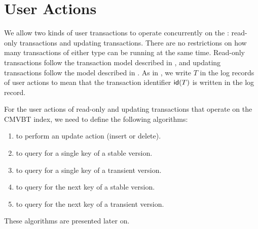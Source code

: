 \section{User Actions}
\label{sec:cmvbt:user-actions}

We allow two kinds of user transactions to operate concurrently on
the : read-only transactions and updating transactions. 
There are no restrictions on how many transactions of either type
can be running at the same time.
Read-only transactions follow the transaction model described in
, and updating transactions follow the
model described in .
As in , we write $T$ in the log records of
user actions to mean that the transaction identifier $\text{\textsf{id}}(T)$ is written in
the log record.

For the user actions of read-only and updating transactions that operate on
the CMVBT index, we need to define the following algorithms: 
\begin{enumerate}
\setlength{\itemsep}{0pt}
\item {} to perform an update action (insert or delete).
\item {} to query for a single key of a stable version.
\item {} to query for a single key of a transient
version.
\item {} to query for the next key of a stable version.
\item {} to query for the next key of a transient
version.
\end{enumerate}
These algorithms are presented later on. 

